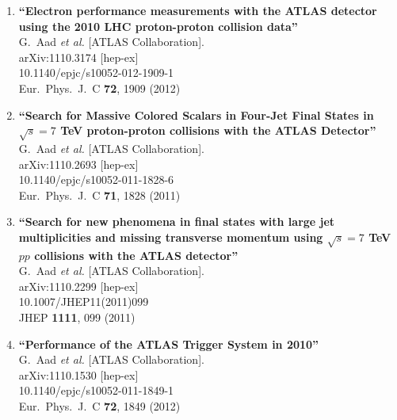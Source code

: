 \documentclass{article}
\begin{document}
\begin{enumerate}
\item%
{\bf ``Electron performance measurements with the ATLAS detector using the 2010 LHC proton-proton collision data''}
  \\{}G.~Aad {\it et al.}  [ATLAS Collaboration].
  \\{}arXiv:1110.3174 [hep-ex]
    \\{}10.1140/epjc/s10052-012-1909-1
\\{}Eur.\ Phys.\ J.\ C {\bf 72}, 1909 (2012) %


\item%
{\bf ``Search for Massive Colored Scalars in Four-Jet Final States in $\sqrt{s}=7$ TeV proton-proton collisions with the ATLAS Detector''}
  \\{}G.~Aad {\it et al.}  [ATLAS Collaboration].
  \\{}arXiv:1110.2693 [hep-ex]
    \\{}10.1140/epjc/s10052-011-1828-6
\\{}Eur.\ Phys.\ J.\ C {\bf 71}, 1828 (2011) %


\item%
{\bf ``Search for new phenomena in final states with large jet multiplicities and missing transverse momentum using $\sqrt{s}=7$ TeV $pp$ collisions with the ATLAS detector''}
  \\{}G.~Aad {\it et al.}  [ATLAS Collaboration].
  \\{}arXiv:1110.2299 [hep-ex]
    \\{}10.1007/JHEP11(2011)099
\\{}JHEP {\bf 1111}, 099 (2011) %


\item%
{\bf ``Performance of the ATLAS Trigger System in 2010''}
  \\{}G.~Aad {\it et al.}  [ATLAS Collaboration].
  \\{}arXiv:1110.1530 [hep-ex]
    \\{}10.1140/epjc/s10052-011-1849-1
\\{}Eur.\ Phys.\ J.\ C {\bf 72}, 1849 (2012) %



\end{enumerate}
\end{document}
